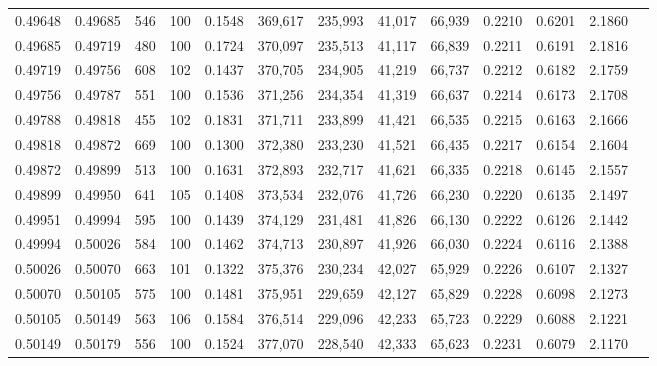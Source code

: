 \begin{tabular}{rrrrrrrrrrrrr}
0.49648 & 0.49685 &   546 & 100 &                                     0.1548 & 369,617 & 235,993 &  41,017 &  66,939 & 0.2210 & 0.6201 & 2.1860 \\
0.49685 & 0.49719 &   480 & 100 &                                     0.1724 & 370,097 & 235,513 &  41,117 &  66,839 & 0.2211 & 0.6191 & 2.1816 \\
0.49719 & 0.49756 &   608 & 102 &                                     0.1437 & 370,705 & 234,905 &  41,219 &  66,737 & 0.2212 & 0.6182 & 2.1759 \\
0.49756 & 0.49787 &   551 & 100 &                                     0.1536 & 371,256 & 234,354 &  41,319 &  66,637 & 0.2214 & 0.6173 & 2.1708 \\
0.49788 & 0.49818 &   455 & 102 &                                     0.1831 & 371,711 & 233,899 &  41,421 &  66,535 & 0.2215 & 0.6163 & 2.1666 \\
0.49818 & 0.49872 &   669 & 100 &                                     0.1300 & 372,380 & 233,230 &  41,521 &  66,435 & 0.2217 & 0.6154 & 2.1604 \\
0.49872 & 0.49899 &   513 & 100 &                                     0.1631 & 372,893 & 232,717 &  41,621 &  66,335 & 0.2218 & 0.6145 & 2.1557 \\
0.49899 & 0.49950 &   641 & 105 &                                     0.1408 & 373,534 & 232,076 &  41,726 &  66,230 & 0.2220 & 0.6135 & 2.1497 \\
0.49951 & 0.49994 &   595 & 100 &                                     0.1439 & 374,129 & 231,481 &  41,826 &  66,130 & 0.2222 & 0.6126 & 2.1442 \\
0.49994 & 0.50026 &   584 & 100 &                                     0.1462 & 374,713 & 230,897 &  41,926 &  66,030 & 0.2224 & 0.6116 & 2.1388 \\
0.50026 & 0.50070 &   663 & 101 &                                     0.1322 & 375,376 & 230,234 &  42,027 &  65,929 & 0.2226 & 0.6107 & 2.1327 \\
0.50070 & 0.50105 &   575 & 100 &                                     0.1481 & 375,951 & 229,659 &  42,127 &  65,829 & 0.2228 & 0.6098 & 2.1273 \\
0.50105 & 0.50149 &   563 & 106 &                                     0.1584 & 376,514 & 229,096 &  42,233 &  65,723 & 0.2229 & 0.6088 & 2.1221 \\
0.50149 & 0.50179 &   556 & 100 &                                     0.1524 & 377,070 & 228,540 &  42,333 &  65,623 & 0.2231 & 0.6079 & 2.1170 \\

\end{tabular}
